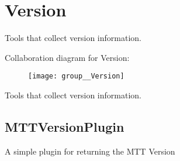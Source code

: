 \hypertarget{group__Version}{\section{Version}
\label{group__Version}
}


Tools that collect version information.  


Collaboration diagram for Version\-:\nopagebreak
\begin{figure}[H]
\begin{center}
\leavevmode
\texttt{[image: group\_\_Version]}
\end{center}
\end{figure}
Tools that collect version information. \hypertarget{group__Version_MTTVersionPlugin}{}\subsection{M\-T\-T\-Version\-Plugin}\label{group__Version_MTTVersionPlugin}
A simple plugin for returning the M\-T\-T Version 